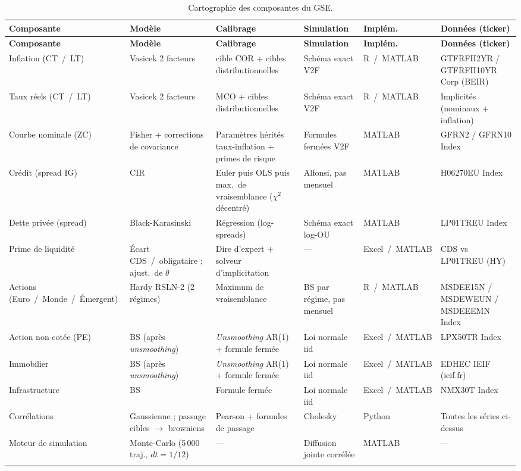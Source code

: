 \documentclass[11pt,a4paper]{article}
\renewcommand{\arraystretch}{1.4}
\newcommand{\tablehead}[1]{\textcolor{nxnavy}{\sffamily\bfseries\small #1}}
\begin{document}
\begingroup\small\setlength{\tabcolsep}{3pt}\renewcommand{\arraystretch}{1.2}
\begin{longtable}{>{\raggedright\arraybackslash}p{2.0cm}>{\raggedright\arraybackslash}p{2.3cm}>{\raggedright\arraybackslash}p{2.6cm}>{\raggedright\arraybackslash}p{2.3cm}>{\raggedright\arraybackslash}p{1.3cm}>{\raggedright\arraybackslash}p{2.4cm}}
\toprule
\tablehead{Composante} & \tablehead{Modèle} & \tablehead{Calibrage} & \tablehead{Simulation} & \tablehead{Implém.} & \tablehead{Données (ticker)} \\
\midrule
\endfirsthead
\toprule
\tablehead{Composante} & \tablehead{Modèle} & \tablehead{Calibrage} & \tablehead{Simulation} & \tablehead{Implém.} & \tablehead{Données (ticker)} \\
\midrule
\endhead
\bottomrule
\endfoot
\rowcolor{nxlightblue} Inflation (CT~/~LT) & Vasicek 2 facteurs & cible COR + cibles distributionnelles & Schéma exact V2F & R~/~MATLAB & GTFRFII2YR / GTFRFII10YR Corp (BEIR) \\
Taux réels (CT~/~LT) & Vasicek 2 facteurs & MCO + cibles distributionnelles & Schéma exact V2F & R~/~MATLAB & Implicités (nominaux + inflation) \\
\rowcolor{nxlightblue} Courbe nominale (ZC) & Fisher + corrections de covariance & Paramètres hérités taux-inflation + primes de risque & Formules fermées V2F & MATLAB & GFRN2 / GFRN10 Index \\
Crédit (spread IG) & CIR & Euler puis OLS puis max.\ de vraisemblance ($\chi^2$ décentré) & Alfonsi, pas mensuel & MATLAB & H06270EU Index \\
\rowcolor{nxlightblue} Dette privée (spread) & Black-Karasinski & Régression (log-spreads) & Schéma exact log-OU & MATLAB & LP01TREU Index \\
Prime de liquidité & Écart CDS~/~obligataire ; ajust.\ de $\theta$ & Dire d'expert + solveur d'implicitation & --- & Excel~/~MATLAB & CDS vs LP01TREU (HY) \\
\rowcolor{nxlightblue} Actions (Euro~/~Monde~/~Émergent) & Hardy RSLN-2 (2 régimes) & Maximum de vraisemblance & BS par régime, pas mensuel & R~/~MATLAB & MSDEE15N / MSDEWEUN / MSDEEEMN Index \\
Action non cotée (PE) & BS (après \emph{unsmoothing}) & \emph{Unsmoothing} AR(1) + formule fermée & Loi normale iid & Excel~/~MATLAB & LPX50TR Index \\
\rowcolor{nxlightblue} Immobilier & BS (après \emph{unsmoothing}) & \emph{Unsmoothing} AR(1) + formule fermée & Loi normale iid & Excel~/~MATLAB & EDHEC IEIF (ieif.fr) \\
Infrastructure & BS & Formule fermée & Loi normale iid & Excel~/~MATLAB & NMX30T Index \\
\rowcolor{nxlightblue} Corrélations & Gaussienne ; passage cibles $\to$ browniens & Pearson + formules de passage & Cholesky & Python & Toutes les séries ci-dessus \\
Moteur de simulation & Monte-Carlo (5\,000 traj., $dt=1/12$) & --- & Diffusion jointe corrélée & MATLAB & --- \\
\caption{Cartographie des composantes du GSE.}
\label{tab:carto}
\end{longtable}
\endgroup
\end{document}
